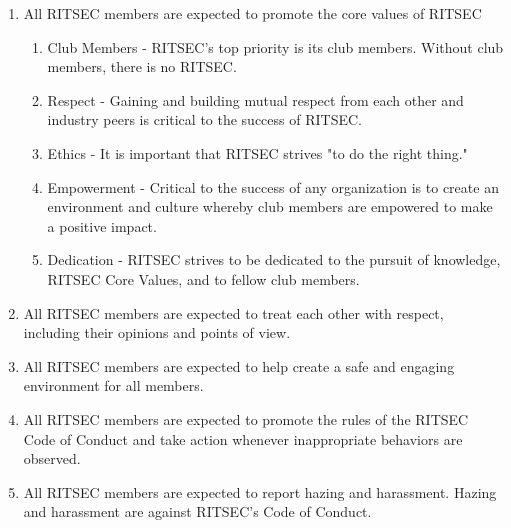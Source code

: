 


\begin{enumerate}
      \item All RITSEC members are expected to promote the core values of RITSEC
            \begin{enumerate}
                  \item Club Members - RITSEC's top priority is its club members. Without club members,
                        there is no RITSEC.
                  \item Respect - Gaining and building mutual respect from each other and industry
                        peers is critical to the success of RITSEC.
                  \item Ethics - It is important that RITSEC strives "to do the right thing."
                  \item Empowerment - Critical to the success of any organization is to create an
                        environment and culture whereby club members are empowered to make a positive
                        impact.
                  \item Dedication - RITSEC strives to be dedicated to the pursuit of knowledge, RITSEC
                        Core Values, and to fellow club members.
            \end{enumerate}
      \item All RITSEC members are expected to treat each other with respect, including
            their opinions and points of view.
      \item All RITSEC members are expected to help create a safe and engaging environment
            for all members.
      \item All RITSEC members are expected to promote the rules of the RITSEC Code of
            Conduct and take action whenever inappropriate behaviors are observed.
      \item All RITSEC members are expected to report hazing and harassment. Hazing and
            harassment are against RITSEC’s Code of Conduct.
\end{enumerate}


